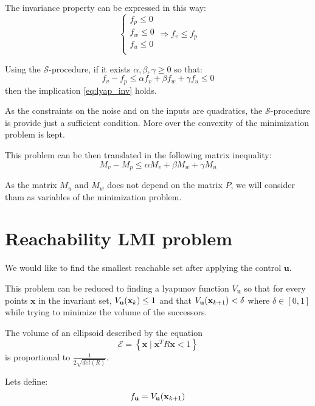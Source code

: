 \documentclass{article}
\theoremstyle{named}
\newcommand{\vect}[1]{\ensuremath{ \mathbf{#1}}}
\newcommand{\Sproc}{$\mathcal{S}$-procedure}
\begin{document}
The invariance property can be expressed in this way:
\begin{equation}\label{eq:lyap_inv}
\left\{
\begin{array}{l}
f_p \leq 0\\
f_w \leq 0\\
f_u \leq 0\\
\end{array}
\right.
\Rightarrow
f_v \leq f_p
\end{equation}

Using the \Sproc{}, if it exists $\alpha,\beta,\gamma \geq 0$ so that:
$$
f_v-f_p \leq \alpha f_v + \beta f_w + \gamma f_u \leq 0
$$
then the implication \ref{eq:lyap_inv} holds.

As the constraints on the noise and on the inputs are quadratics, the \Sproc{} is provide just a sufficient condition. More over the convexity of the minimization problem is kept.

This problem can be then translated in the following matrix inequality:
$$
M_v-M_p \leq \alpha M_v + \beta M_w + \gamma M_u
$$

As the matrix $M_u$ and $M_w$ does not depend on the matrix $P$, we will consider tham as variables of the minimization problem.

\section{Reachability LMI problem}
\newcommand{\Vu}{V_{\vect{u}}}
We would like to find the smallest reachable set after applying the control $\vect{u}$.

This problem can be reduced to finding a lyapunov function $\Vu$ so that for every points $\vect{x}$ in the invariant set, $\Vu(\xk) \leq 1$ and that $\Vu(\xkn)< \delta$ where $\delta \in [0,1]$ while trying to minimize the volume of the successors.

The volume of an ellipsoid described by the equation 
$$
\mathcal{E} = \left\{ \vect{x} \mid \vect{x}^T R \vect{x} < 1 \right\}
$$
is proportional to $\frac{1}{2 \sqrt{det( R )}}$.

\newcommand{\fu}{f_{\vect{u}}}
Lets define:
$$\fu = \Vu(\xkn)$$
\end{document}
